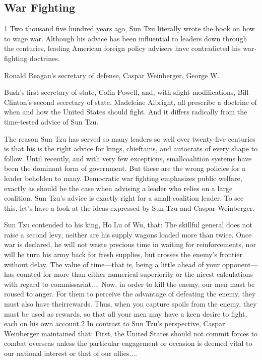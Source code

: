 \documentclass[10pt]{article}
\begin{document}
\subsection{War Fighting}

{\large 1 Two thousand five hundred years ago, Sun Tzu literally wrote the book
on how to wage war. Although his advice has been influential to leaders down
through the centuries, leading American foreign policy advisers have contradicted
his war-fighting doctrines.}

{\large Ronald Reagan's secretary of defense, Caspar Weinberger, George W.}

{\large Bush's first secretary of state, Colin Powell, and, with slight
modifications, Bill Clinton's second secretary of state, Madeleine Albright, all
prescribe a doctrine of when and how the United States should fight. And it
differs radically from the time-tested advice of Sun Tzu.}

{\large The reason Sun Tzu has served so many leaders so well over twenty-five
centuries is that his is the right advice for kings, chieftains, and autocrats of
every shape to follow. Until recently, and with very few exceptions,
smallcoalition systems have been the dominant form of government. But these are
the wrong policies for a leader beholden to many. Democratic war fighting
emphasizes public welfare, exactly as should be the case when advising a leader
who relies on a large coalition. Sun Tzu's advice is exactly right for a
small-coalition leader. To see this, let's have a look at the ideas expressed by
Sun Tzu and Caspar Weinberger.}

{\large Sun Tzu contended to his king, Ho Lu of Wu, that: The skillful general
does not raise a second levy, neither are his supply wagons loaded more than
twice. Once war is declared, he will not waste precious time in waiting for
reinforcements, nor will he turn his army back for fresh supplies, but crosses
the enemy's frontier without delay. The value of time---that is, being a little
ahead of your opponent---has counted for more than either numerical superiority
or the nicest calculations with regard to commissariat.... Now, in order to kill
the enemy, our men must be roused to anger. For them to perceive the advantage of
defeating the enemy, they must also have theirrewards. Thus, when you capture
spoils from the enemy, they must be used as rewards, so that all your men may
have a keen desire to fight, each on his own account.2 In contrast to Sun Tzu's
perspective, Caspar Weinberger maintained that: First, the United States should
not commit forces to combat overseas unless the particular engagement or occasion
is deemed vital to our national interest or that of our allies....}
\end{document}
